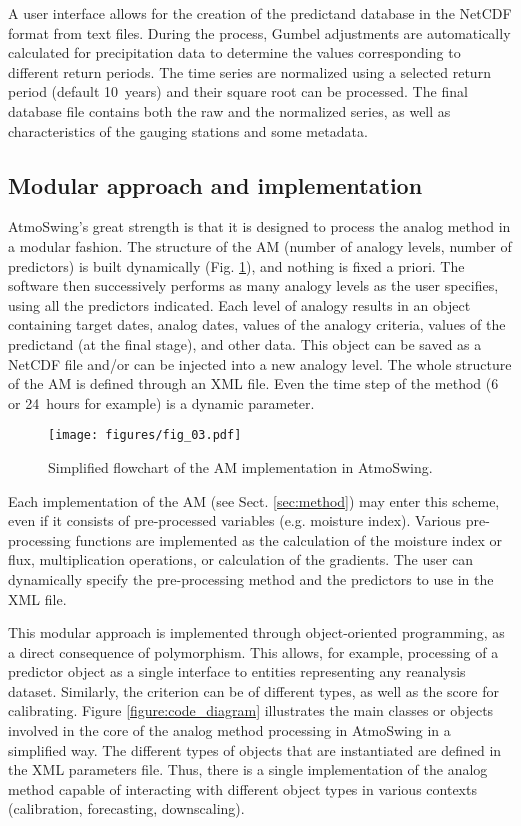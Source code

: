 \documentclass[review]{elsarticle}
\begin{document}
A user interface allows for the creation of the predictand database in the NetCDF format from text files. During the process, Gumbel adjustments are automatically calculated for precipitation data to determine the values corresponding to different return periods. The time series are normalized using a selected return period (default 10~years) and their square root can be processed. The final database file contains both the raw and the normalized series, as well as characteristics of the gauging stations and some metadata.


\subsection{Modular approach and implementation}

AtmoSwing's great strength is that it is designed to process the analog method in a modular fashion. The structure of the AM (number of analogy levels, number of predictors) is built dynamically (Fig. \ref{figure:flowchart_modules_atmoswing}), and nothing is fixed a priori. The software then successively performs as many analogy levels as the user specifies, using all the predictors indicated. Each level of analogy results in an object containing target dates, analog dates, values of the analogy criteria, values of the predictand (at the final stage), and other data. This object can be saved as a NetCDF file and/or can be injected into a new analogy level. The whole structure of the AM is defined through an XML file. Even the time step of the method (6 or 24~hours for example) is a dynamic parameter.

\begin{figure}[hbt!]
	\texttt{[image: figures/fig\_03.pdf]}
	\caption{Simplified flowchart of the AM implementation in AtmoSwing.}
	\label{figure:flowchart_modules_atmoswing}
\end{figure}

Each implementation of the AM (see Sect. \ref{sec:method}) may enter this scheme, even if it consists of pre-processed variables (e.g. moisture index). Various pre-processing functions are implemented as the calculation of the moisture index or flux, multiplication operations, or calculation of the gradients. The user can dynamically specify the pre-processing method and the predictors to use in the XML file.

This modular approach is implemented through object-oriented programming, as a direct consequence of polymorphism. This allows, for example, processing of a predictor object as a single interface to entities representing any reanalysis dataset. Similarly, the criterion can be of different types, as well as the score for calibrating. Figure \ref{figure:code_diagram} illustrates the main classes or objects involved in the core of the analog method processing in AtmoSwing in a simplified way. The different types of objects that are instantiated are defined in the XML parameters file. Thus, there is a single implementation of the analog method capable of interacting with different object types in various contexts (calibration, forecasting, downscaling). 
\end{document}
